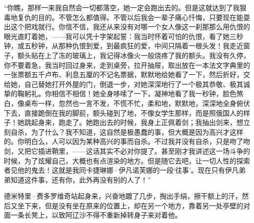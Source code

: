 \par “你瞧，那样一来我自然会一切都落空，她一定会跑出去的。但是这就达到了我狠毒地复仇的目的。不管怎么都值得。不管以后我会一辈子痛心忏悔，只要现在能耍出这个把戏就行。你信不信，我还从来没有对哪一个女人像这一刹那那么用仇恨的眼光直盯着她，——我可以凭十字架起誓：我当时怀着可怕的仇恨，看了她三秒钟，或五秒钟，从那种仇恨到爱，到最疯狂的爱，中间只隔着一根头发！我走近窗子，额头贴在上了冻的玻璃上，我记得冰像火一般烧疼了我的额头。我没有久停，你不要着急，我当时回过身来，走到桌旁，拉开抽屉，取出放在一本法文字典里的一张票额五千卢布、利息五厘的不记名票据，默默地给她看了一下，然后折好，交给她，自己替她打开外屋的门，倒退一步，对她深深地行了一个极其恭敬、极其诚挚的鞠躬礼。你相信不相信！她全身哆嗦了一下，凝神地看了我一秒钟，脸色煞白，像桌布一样，忽然也一言不发，不慌不忙，柔和地，默默地，深深地全身俯伏下去，直接跪倒在我的脚前，额头碰到了地，不像女学生那样，而是照俄国人的样子！她跳起身来，跑走了。她跑出去的时候，我身上正佩着剑；我抽出剑来，想立刻自杀，为了什么？我不知道，这自然是极愚蠢的事，但大概是因为高兴才这样的。你明白么，人可以因为某种高兴的事而自杀。不过我并没有自杀，只是吻了吻剑，又把它插进鞘里，——这话其实不必对你提了。甚至刚才我讲述这一场斗争的时候，为了炫耀自己，大概也有点渲染的地方。但是随它去吧，让一切人性的探索者见他的鬼去！这就是我同卡捷琳娜·伊凡诺芙娜的一段‘往事’。现在只有伊凡弟弟知道这件事，还有你，此外再没有别的人了！”
\par 德米特里·费多罗维奇站起身来，兴奋地踱了几步，掏出手绢，擦干额上的汗，然后又坐下来，但是没有坐在原来的位置上，却在另一个地方，靠着另一处亭壁的对面一条长凳上，以致阿辽沙不得不重新掉转身子来对着他。
